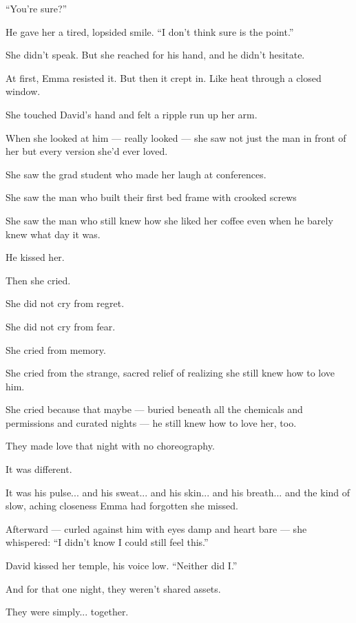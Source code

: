 ``You’re sure?''

He gave her a tired, lopsided smile. ``I don’t think sure is the point.''

She didn’t speak. But she reached for his hand, and  he didn’t hesitate.

At first, Emma resisted it. But then it crept in. Like heat through 
a closed window.

She touched David’s hand and felt a ripple run up her arm. 

When she looked at him --- really looked --- she saw not just the man in front of her but every 
version she’d ever loved.

She saw the grad student who made her laugh at conferences.

She saw the man who built their first bed frame with crooked screws

She saw the man who still knew how she liked her coffee even when he barely knew what day it was.

He kissed her.

Then she cried.

She did not cry from regret. 

She did not cry from fear.

She cried from memory.

She cried from the strange, sacred relief of realizing she still knew how to love him.

She cried because that maybe 
--- 
buried beneath all the chemicals and permissions and curated nights 
--- 
he still knew how to love her, too.

They made love that night with no choreography. 

It was different.

It was his pulse... and his sweat... and his skin... and his breath... and the kind of slow, 
aching closeness Emma had forgotten she missed.

Afterward --- curled against him with eyes damp and heart bare --- she whispered:
``I didn’t know I could still feel this.''

David kissed her temple, his voice low.
``Neither did I.''

And for that one night, they weren't shared assets.

They were simply... together.


